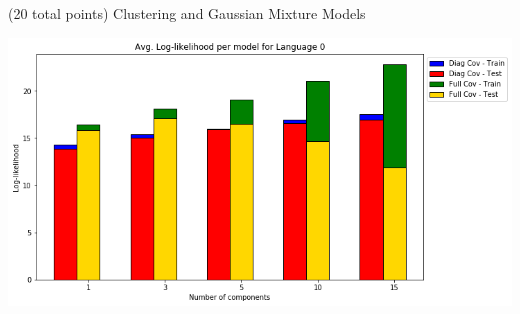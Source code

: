 \documentclass[12pt]{article}
\begin{document}
\begin{question}{(20 total points) Clustering and Gaussian Mixture Models}
\begin{subquestion}
      \begin{answerbox}{30em}
         \begin{center}
             \includegraphics[width=\textwidth]{results/3_5.png}
         \end{center}
      \end{answerbox}
  


   \end{subquestion}

   
\end{question}
\end{document}
